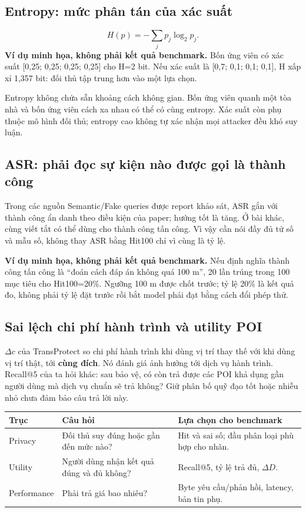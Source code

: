 \documentclass[10pt,a4paper]{article}
\newcommand{\example}{\textbf{Ví dụ minh họa, không phải kết quả benchmark.} }
\begin{document}
\subsection*{Entropy: mức phân tán của xác suất}
\[
H(p)=-\sum_j p_j\log_2 p_j.
\]
\example Bốn ứng viên có xác suất [0,25; 0,25; 0,25; 0,25] cho H=2 bit. Nếu xác suất là [0,7; 0,1; 0,1; 0,1], H xấp xỉ 1,357 bit: đối thủ tập trung hơn vào một lựa chọn.

Entropy không chứa sẵn khoảng cách không gian. Bốn ứng viên quanh một tòa nhà và bốn ứng viên cách xa nhau có thể có cùng entropy. Xác suất còn phụ thuộc mô hình đối thủ; entropy cao không tự xác nhận mọi attacker đều khó suy luận.

\subsection*{ASR: phải đọc sự kiện nào được gọi là thành công}
Trong các nguồn Semantic/Fake queries được report khảo sát, ASR gắn với thành công ẩn danh theo điều kiện của paper; hướng tốt là tăng. Ở bài khác, cùng viết tắt có thể dùng cho thành công tấn công. Vì vậy cần nói đầy đủ tử số và mẫu số, không thay ASR bằng Hit100 chỉ vì cùng là tỷ lệ.

\example Nếu định nghĩa thành công tấn công là ``đoán cách đáp án không quá 100 m'', 20 lần trúng trong 100 mục tiêu cho Hit100=20\%. Ngưỡng 100 m được chốt trước; tỷ lệ 20\% là kết quả đo, không phải tỷ lệ đặt trước rồi bắt model phải đạt bằng cách đổi phép thử.

\subsection*{Sai lệch chi phí hành trình và utility POI}
$\Delta c$ của TransProtect so chi phí hành trình khi dùng vị trí thay thế với khi dùng vị trí thật, tới \textbf{cùng đích}. Nó đánh giá ảnh hưởng tới dịch vụ hành trình. Recall@5 của ta hỏi khác: sau bảo vệ, có còn trả được các POI khả dụng gần người dùng mà dịch vụ chuẩn sẽ trả không? Giữ phân bố quỹ đạo tốt hoặc nhiễu nhỏ chưa đảm bảo câu trả lời này.

\begin{longtable}{@{}P{4.0cm}P{6.1cm}P{6.1cm}@{}}
\toprule Trục & Câu hỏi & Lựa chọn cho benchmark\\\midrule
Privacy & Đối thủ suy đúng hoặc gần đến mức nào? & Hit và sai số; đầu phân loại phù hợp cho nhãn.\\[3pt]
Utility & Người dùng nhận kết quả đúng và đủ không? & Recall@5, tỷ lệ trả đủ, $\Delta D$.\\[3pt]
Performance & Phải trả giá bao nhiêu? & Byte yêu cầu/phản hồi, latency, bản tin phụ.\\
\bottomrule
\end{longtable}
\end{document}
